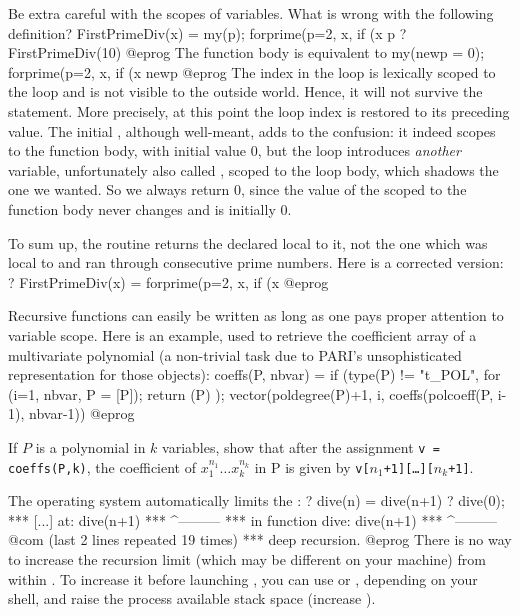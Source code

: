 \label{se:bewarescope}
Be extra careful with the scopes of variables. What is wrong with the
following definition?
\bprog
FirstPrimeDiv(x) =
{ my(p);
  forprime(p=2, x, if (x%
  p
}
? FirstPrimeDiv(10)
@eprog\noindent {} The function body is equivalent to
\bprog
{ my(newp = 0);
  forprime(p=2, x, if (x%
  newp
}
@eprog\noindent
{} The index  in the 
loop is lexically scoped to the loop and is not visible to the outside world.
Hence, it will not survive the  statement. More precisely, at this
point the loop index is restored to its preceding value. The initial
, although well-meant, adds to the confusion: it indeed scopes
 to the function body, with initial value $0$, but the 
loop introduces \emph{another} variable, unfortunately also called ,
scoped to the loop body, which shadows the one we wanted. So we always return
$0$, since the value of the  scoped to the function body never changes
and is initially $0$.

To sum up, the routine returns the  declared local to
it, not the one which was local to  and ran through consecutive
prime numbers. Here is a corrected version:
\bprog
? FirstPrimeDiv(x) = forprime(p=2, x, if (x%
@eprog

 Recursive functions can easily
be written as long as one pays proper attention to variable scope. Here is an
example, used to retrieve the coefficient array of a multivariate polynomial
(a non-trivial task due to PARI's unsophisticated representation for those
objects): 
\bprog
coeffs(P, nbvar) =
{
  if (type(P) != "t_POL",
    for (i=1, nbvar, P = [P]);
    return (P)
  );
  vector(poldegree(P)+1, i, coeffs(polcoeff(P, i-1), nbvar-1))
}
@eprog

\noindent If $P$ is a polynomial in $k$ variables, show that after the
assignment {\tt v = coeffs(P,k)}, the coefficient of $x_1^{n_1}\dots
x_k^{n_k}$ in P is given by {\tt v[$n_1$+1][\dots][$n_k$+1]}.

The operating system automatically limits the :
\bprog
? dive(n) = dive(n+1)
? dive(0);
  ***   [...] at: dive(n+1)
  ***             ^---------
  ***   in function dive: dive(n+1)
  ***                     ^---------
  \\@com (last 2 lines repeated 19 times)
  ***   deep recursion.
@eprog\noindent
There is no way to increase the recursion limit (which may be different on
your machine) from within . To increase it before launching ,
you can use  or , depending on your shell, and raise
the process available stack space (increase ).


